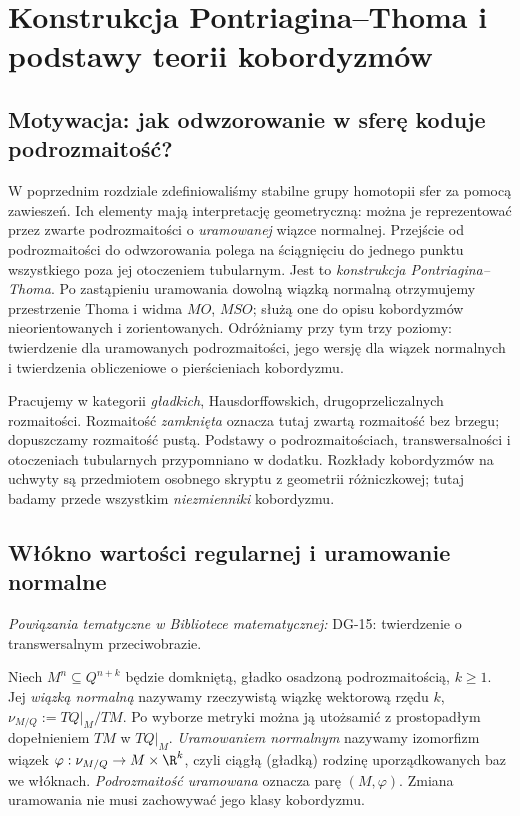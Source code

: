 \chapter{Konstrukcja Pontriagina--Thoma i podstawy teorii kobordyzmów}
\label{ch:pt-v9}

\providecommand{\atlasref}[2]{#2}


\section{Motywacja: jak odwzorowanie w sferę koduje podrozmaitość?}
W poprzednim rozdziale zdefiniowaliśmy stabilne grupy homotopii sfer
za pomocą zawieszeń. Ich elementy mają interpretację geometryczną:
można je reprezentować przez zwarte podrozmaitości o \emph{uramowanej}
wiązce normalnej. Przejście od podrozmaitości do odwzorowania
polega na ściągnięciu do jednego punktu wszystkiego poza jej
otoczeniem tubularnym. Jest to \emph{konstrukcja Pontriagina--Thoma}.
Po zastąpieniu uramowania dowolną wiązką normalną otrzymujemy
przestrzenie Thoma i widma $MO$, $MSO$; służą one do opisu
kobordyzmów nieorientowanych i zorientowanych. Odróżniamy przy tym
trzy poziomy: twierdzenie dla uramowanych podrozmaitości,
jego wersję dla wiązek normalnych i twierdzenia obliczeniowe
o pierścieniach kobordyzmu.

Pracujemy w kategorii \emph{gładkich}, Hausdorffowskich,
drugoprzeliczalnych rozmaitości. Rozmaitość \emph{zamknięta}
oznacza tutaj zwartą rozmaitość bez brzegu; dopuszczamy
rozmaitość pustą. Podstawy o podrozmaitościach, transwersalności
i otoczeniach tubularnych przypomniano w dodatku. Rozkłady
kobordyzmów na uchwyty są przedmiotem osobnego skryptu z geometrii
różniczkowej; tutaj badamy przede wszystkim \emph{niezmienniki}
kobordyzmu.

\section{Włókno wartości regularnej i uramowanie normalne}

\noindent\emph{Powiązania tematyczne w Bibliotece matematycznej:} \atlasref{DG-15::thm:transwersalny-przeciwobraz}{DG-15: twierdzenie o transwersalnym przeciwobrazie}.

\begin{definicja}
Niech $M^n\subseteq Q^{n+k}$ będzie domkniętą, gładko
osadzoną podrozmaitością, $k\ge1$. Jej \emph{wiązką normalną}
nazywamy rzeczywistą wiązkę wektorową rzędu $k$,
$\nu_{M/Q}:=TQ|_M/TM$. Po wyborze metryki można ją
utożsamić z prostopadłym dopełnieniem $TM$ w $TQ|_M$.
\emph{Uramowaniem normalnym} nazywamy izomorfizm wiązek
$\varphi:\nu_{M/Q}\to M\times\R^k$, czyli ciągłą
(gładką) rodzinę uporządkowanych baz we włóknach.
\emph{Podrozmaitość uramowana} oznacza parę $(M,\varphi)$.
Zmiana uramowania nie musi zachowywać jego klasy kobordyzmu.
\end{definicja}


